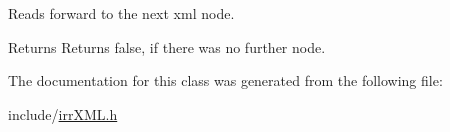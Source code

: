 Reads forward to the next xml node. 

\begin{DoxyReturn}{Returns}
Returns false, if there was no further node. 
\end{DoxyReturn}


The documentation for this class was generated from the following file\+:\begin{DoxyCompactItemize}
\item 
include/\hyperlink{irrXML_8h}{irr\+X\+M\+L.\+h}\end{DoxyCompactItemize}
